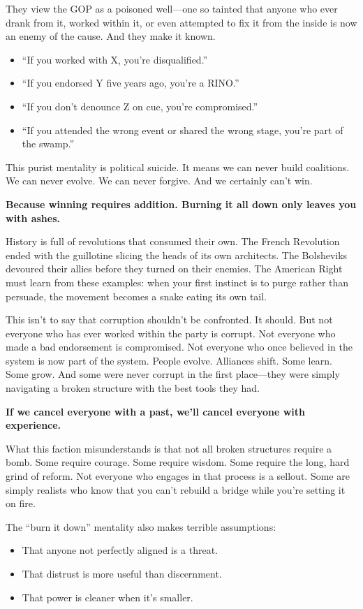 They view the GOP as a poisoned well—one so tainted that anyone who ever drank from it, worked within it, or even attempted to fix it from the inside is now an enemy of the cause. And they make it known.

\begin{itemize}
    \item ``If you worked with X, you’re disqualified.''
    \item ``If you endorsed Y five years ago, you’re a RINO.''
    \item ``If you don’t denounce Z on cue, you’re compromised.''
    \item ``If you attended the wrong event or shared the wrong stage, you're part of the swamp.''
\end{itemize}

This purist mentality is political suicide. It means we can never build coalitions. We can never evolve. We can never forgive. And we certainly can’t win. 

\textbf{Because winning requires addition. Burning it all down only leaves you with ashes.}

History is full of revolutions that consumed their own. The French Revolution ended with the guillotine slicing the heads of its own architects. The Bolsheviks devoured their allies before they turned on their enemies. The American Right must learn from these examples: when your first instinct is to purge rather than persuade, the movement becomes a snake eating its own tail.

This isn’t to say that corruption shouldn’t be confronted. It should. But not everyone who has ever worked within the party is corrupt. Not everyone who made a bad endorsement is compromised. Not everyone who once believed in the system is now part of the system. People evolve. Alliances shift. Some learn. Some grow. And some were never corrupt in the first place—they were simply navigating a broken structure with the best tools they had.

\textbf{If we cancel everyone with a past, we’ll cancel everyone with experience.}

What this faction misunderstands is that not all broken structures require a bomb. Some require courage. Some require wisdom. Some require the long, hard grind of reform. Not everyone who engages in that process is a sellout. Some are simply realists who know that you can’t rebuild a bridge while you’re setting it on fire.

The ``burn it down'' mentality also makes terrible assumptions:
\begin{itemize}
    \item That anyone not perfectly aligned is a threat.
    \item That distrust is more useful than discernment.
    \item That power is cleaner when it’s smaller.
\end{itemize}

